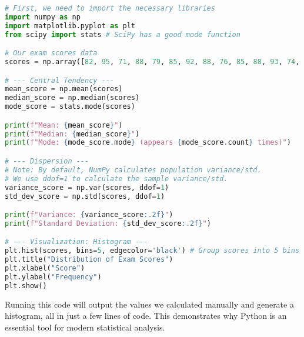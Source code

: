 \begin{lstlisting}[language=Python, caption=Calculating descriptive statistics with Python., label=list:python-stats]
# First, we need to import the necessary libraries
import numpy as np
import matplotlib.pyplot as plt
from scipy import stats # SciPy has a good mode function

# Our exam scores data
scores = np.array([82, 95, 71, 88, 79, 85, 92, 88, 76, 85, 88, 93, 74, 85, 82, 78, 88, 90, 85, 79])

# --- Central Tendency ---
mean_score = np.mean(scores)
median_score = np.median(scores)
mode_score = stats.mode(scores)

print(f"Mean: {mean_score}")
print(f"Median: {median_score}")
print(f"Mode: {mode_score.mode} (appears {mode_score.count} times)")

# --- Dispersion ---
# Note: By default, NumPy calculates population variance/std.
# We use ddof=1 to calculate the sample variance/std.
variance_score = np.var(scores, ddof=1)
std_dev_score = np.std(scores, ddof=1)

print(f"Variance: {variance_score:.2f}")
print(f"Standard Deviation: {std_dev_score:.2f}")

# --- Visualization: Histogram ---
plt.hist(scores, bins=5, edgecolor='black') # Group scores into 5 bins
plt.title("Distribution of Exam Scores")
plt.xlabel("Score")
plt.ylabel("Frequency")
plt.show()
\end{lstlisting}

Running this code will output the values we calculated manually and generate a histogram, all in just a few lines of code. This demonstrates why Python is an essential tool for modern statistical analysis.

